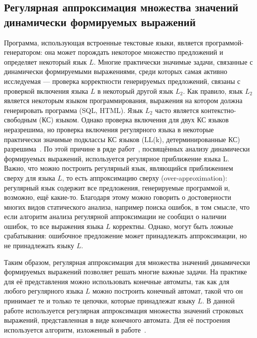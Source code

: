 \subsection{Регулярная аппроксимация множества значений динамически формируемых выражений}
Программа, использующая встроенные текстовые языки, является программой-генератором: она может порождать некоторое множество предложений и определяет некоторый язык $L$. 
Многие практически значимые задачи, связанные с динамически формируемыми выражениями, среди которых самая активно исследуемая --- проверка корректности генерируемых предложений, связаны с 
проверкой включения языка $L$ в некоторый другой язык $L_2$. Как правило, язык $L_2$ является некоторым языком программирования, выражения на котором должна генерировать программа (SQL, HTML). 
Язык $L_2$ часто является контекстно-свободным (КС) языком. Однако проверка включения для двух КС языков неразрешима, но проверка включения регулярного языка в некоторые практически 
значимые подклассы КС языков (LL(k), детерминированные КС) разрешима~\cite{LangInclusion}. По этой причине в ряде работ~\cite{JSA,Alvor1, Alvor2}, посвящённых анализу динамически формируемых выражений, используется регулярное приближение языка L. Важно, что можно построить 
регулярный язык, являющийся приближением сверху для языка $L$, то есть аппроксимацию сверху (over-approximation): регулярный язык содержит все предложения, генерируемые программой и, возможно, ещё какие-то. 
Благодаря этому можно говорить о достоверности многих видов статического анализа, например поиска ошибок, в том смысле, что если алгоритм анализа регулярной аппроксимации не сообщил о наличии ошибок, 
то все выражения языка $L$ корректны. Однако, могут быть ложные срабатывания: ошибочное предложение может принадлежать аппроксимации, но не принадлежать языку $L$.

Таким образом, регулярная аппроксимация для множества значений динамически формируемых выражений позволяет решать многие важные задачи. На практике для её представления можно использовать конечные автоматы, 
так как для любого регулярного языка $L$ можно построить конечный автомат, такой что он принимает те и только те цепочки, которые принадлежат языку $L$. В данной работе используется регулярная аппроксимация 
множества значений строковых выражений, представленная в виде конечного автомата. Для её построения используется алгоритм, изложенный в работе~\cite{Stranger}.

